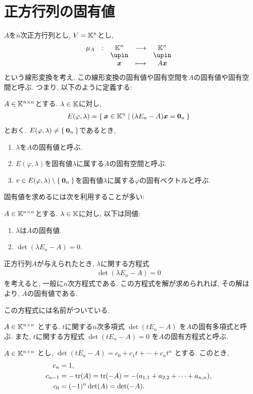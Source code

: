 \section{正方行列の固有値}
$A$を$n$次正方行列とし,
$V=\mathbb{K}^n$とし,
\begin{align*}
  \shazo{\mu_A}{\KK^n}{\KK^n}
  {\xx}{A\xx}
\end{align*}
という線形変換を考え,
この線形変換の固有値や固有空間を$A$の固有値や固有空間と呼ぶ.
つまり, 以下のように定義する:
\begin{definition}
  $A\in\mathbb{K}^{n\times n}$とする.
  $\lambda \in \mathbb{K}$に対し,
  \begin{align*}
    E(\varphi,\lambda) = \Set{\boldsymbol{x}\in\mathbb{K}^n|(\lambda E_n-A)\boldsymbol{x}=\boldsymbol{0}_n}
  \end{align*}
  とおく.
  $E(\varphi,\lambda)\neq \Set{\boldsymbol{0}_n}$であるとき,
  \begin{enumerate}
  \item $\lambda$を$A$の固有値と呼ぶ.
  \item $E(\varphi,\lambda)$を固有値$\lambda$に属する$A$の固有空間と呼ぶ.
  \item $v\in E(\varphi,\lambda)\setminus\Set{\boldsymbol{0}_n}$を固有値$\lambda$に属する$\varphi$の固有ベクトルと呼ぶ.
  \end{enumerate}
\end{definition}

固有値を求めるには次を利用することが多い:
\begin{prop}
\label{prop:mat:eignevalue:rootofcharpoly}
  $A\in\mathbb{K}^{n\times n}$とする.
  $\lambda \in \mathbb{K}$に対し, 以下は同値:
  \begin{enumerate}
  \item $\lambda$は$A$の固有値.
  \item $\det(\lambda E_n-A)=0$.
  \end{enumerate}
\end{prop}

正方行列$A$が与えられたとき,
$\lambda$に関する方程式
\begin{align*}
\det(\lambda E_n-A)=0
\end{align*}
を考えると,
一般に$n$次方程式である.
この方程式を解が求められれば,
その解は
より,
$A$の固有値である.

この方程式には名前がついている.

\begin{definition}
$A\in\mathbb{K}^{n\times n}$
とする.
$t$に関する$n$次多項式
$\det(t E_n-A)$
を$A$の固有多項式と呼ぶ.
また,
$t$に関する方程式
$\det(t E_n-A)=0$
を$A$の固有方程式と呼ぶ.
\end{definition}
\begin{remark}
$A\in\mathbb{K}^{n\times n}$
とし, 
$\det(t E_n-A)=c_0+c_1t+\cdots +c_nt^n$
とする.
このとき,
\begin{align*}
c_n&=1,\\
c_{n-1}&=-\operatorname{tr}(A)=\operatorname{tr}(-A)=-(a_{1,1}+a_{2,2}+\cdots+a_{n,n}),\\
c_0&=(-1)^{n}\det(A)=\det(-A).
\end{align*}
\end{remark}

